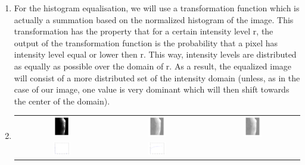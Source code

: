 \documentclass[a4paper]{article}
\begin{document}
\begin{enumerate}
\item
For the histogram equalisation, we will use a transformation function which is actually a summation based on the normalized histogram of the image. This transformation has the property that for a certain intensity level r, the output of the transformation function is the probability that a pixel has intensity level equal or lower then r. This way, intensity levels are distributed as equally as possible over the domain of r. As a result, the equalized image will consist of a more distributed set of the intensity domain (unless, as in the case of our image, one value is very dominant which will then shift towards the center of the domain).


\item
\begin{center}
\begin{tabular}{ccc}
    \includegraphics[width=0.2\textwidth]{../13_spine.png} &
    \includegraphics[width=0.2\textwidth]{../13_spine_eq1x.png} &
    \includegraphics[width=0.2\textwidth]{../13_spine_eq2x.png}\\
    \includegraphics[width=0.2\textwidth]{../13_hist_spine.png} &
    \includegraphics[width=0.2\textwidth]{../13_transformation.png} &

\end{tabular}
\end{center}
\end{enumerate}
\end{document}
